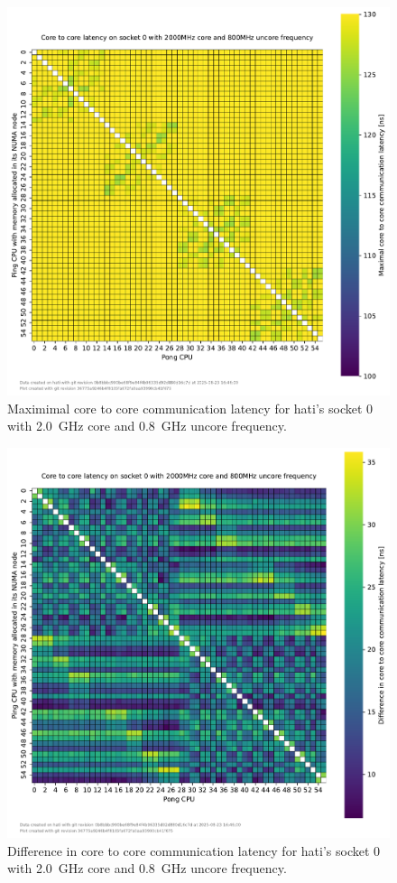 \begin{figure}[]
    \centering
    \includegraphics[width=\columnwidth]{fig/core-to-core-latency/core-to-core-heatmap-max-2000-800.pdf}
    \caption{Maximimal core to core communication latency for hati's socket 0 with \SI{2.0}{\GHz} core and \SI{0.8}{\GHz} uncore frequency.}
\end{figure}
\begin{figure}[]
    \centering
    \includegraphics[width=\columnwidth]{fig/core-to-core-latency/core-to-core-heatmap-diff-2000-800.pdf}
    \caption{Difference in core to core communication latency for hati's socket 0 with \SI{2.0}{\GHz} core and \SI{0.8}{\GHz} uncore frequency.}
\end{figure}

